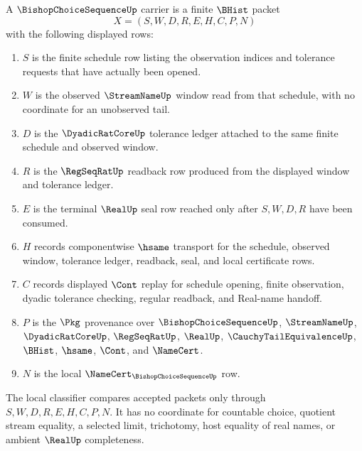 \begin{definition}
\label{def:bishop-choice-sequence-carrier}
A $\BishopChoiceSequenceUp$ carrier is a finite $\BHist$ packet
$$
X=(S,W,D,R,E,H,C,P,N)
$$
with the following displayed rows:
\begin{enumerate}
\item $S$ is the finite schedule row listing the observation indices and tolerance requests that have actually been opened.
\item $W$ is the observed $\StreamNameUp$ window read from that schedule, with no coordinate for an unobserved tail.
\item $D$ is the $\DyadicRatCoreUp$ tolerance ledger attached to the same finite schedule and observed window.
\item $R$ is the $\RegSeqRatUp$ readback row produced from the displayed window and tolerance ledger.
\item $E$ is the terminal $\RealUp$ seal row reached only after $S,W,D,R$ have been consumed.
\item $H$ records componentwise $\hsame$ transport for the schedule, observed window, tolerance ledger, readback, seal, and local certificate rows.
\item $C$ records displayed $\Cont$ replay for schedule opening, finite observation, dyadic tolerance checking, regular readback, and Real-name handoff.
\item $P$ is the $\Pkg$ provenance over $\BishopChoiceSequenceUp$, $\StreamNameUp$, $\DyadicRatCoreUp$, $\RegSeqRatUp$, $\RealUp$, $\CauchyTailEquivalenceUp$, $\BHist$, $\hsame$, $\Cont$, and $\NameCert$.
\item $N$ is the local $\NameCert_{\BishopChoiceSequenceUp}$ row.
\end{enumerate}
The local classifier compares accepted packets only through $S,W,D,R,E,H,C,P,N$. It has no coordinate for countable choice, quotient stream equality, a selected limit, trichotomy, host equality of real names, or ambient $\RealUp$ completeness.
\end{definition}


